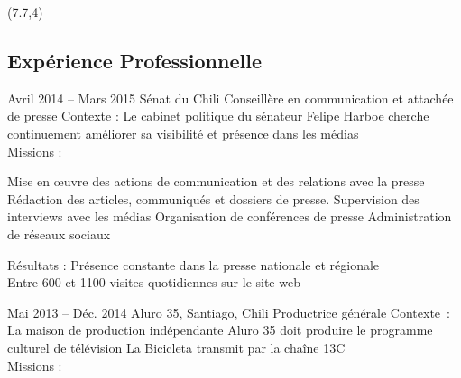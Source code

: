 \documentclass[30pt, french]{tccv}
\begin{document}
\begin{upshape}

\begin{textblock}{13}(7.7,4)
\begin{mdframed}
\section{Expérience Professionnelle}


\begin{eventlist}

\setlength{\parskip}{0pt}
\item{Avril 2014 -- Mars 2015}
     {Sénat du Chili}
     {Conseillère en communication et attachée de presse}
     \fontsize{9pt}{1em}\color{text}\bodyfontlight\upshape\selectfont
     Contexte : Le cabinet politique du sénateur Felipe Harboe cherche continuement améliorer sa visibilité et présence dans les médias \\ 
     Missions : 

    \setlength{\parskip}{-10pt}
    \begin{itemize}
      \setlength\itemsep{-3pt} 
      \cvitem[\checkmark] Mise en œuvre des actions de communication et des relations avec la presse
      \cvitem[\checkmark] Rédaction des articles, communiqués et dossiers de presse. Supervision des interviews avec les médias
      \cvitem[\checkmark] Organisation de conférences de presse
      \cvitem[\checkmark] Administration de réseaux sociaux
    \end{itemize}     
    Résultats : Présence constante dans la presse nationale et régionale  \\
               Entre 600 et 1100 visites quotidiennes sur le site web 
               
\setlength{\parskip}{0pt}        
\item{Mai 2013 -- Déc. 2014}
     {Aluro 35, Santiago, Chili}
     {Productrice générale}
     \fontsize{9pt}{1em}\color{text}\bodyfontlight\upshape\selectfont
    Contexte : La maison de production indépendante Aluro 35 doit produire le programme culturel de télévision La Bicicleta transmit par la chaîne 13C \\
Missions :
    

\end{eventlist}
\end{mdframed}
\end{textblock}
\end{upshape}
\end{document}

